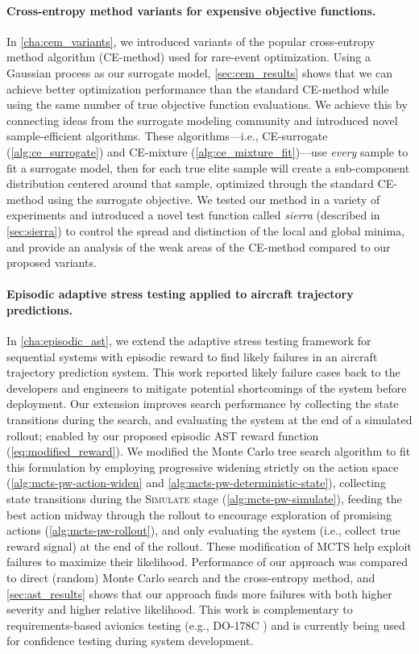 \paragraph{Cross-entropy method variants for expensive objective functions.}
In \cref{cha:cem_variants}, we introduced variants of the popular cross-entropy method algorithm (CE-method) used for rare-event optimization.
Using a Gaussian process as our surrogate model, \cref{sec:cem_results} shows that we can achieve better optimization performance than the standard CE-method while using the same number of true objective function evaluations.
We achieve this by connecting ideas from the surrogate modeling community and introduced novel sample-efficient algorithms.
These algorithms---i.e., CE-surrogate (\cref{alg:ce_surrogate}) and CE-mixture (\cref{alg:ce_mixture_fit})---use \textit{every} sample to fit a surrogate model, then for each true elite sample will create a sub-component distribution centered around that sample, optimized through the standard CE-method using the surrogate objective.
We tested our method in a variety of experiments and introduced a novel test function called \textit{sierra} (described in \cref{sec:sierra}) to control the spread and distinction of the local and global minima, and provide an analysis of the weak areas of the CE-method compared to our proposed variants.


\paragraph{Episodic adaptive stress testing applied to aircraft trajectory predictions.} In \cref{cha:episodic_ast}, we extend the adaptive stress testing framework for sequential systems with episodic reward to find likely failures in an aircraft trajectory prediction system.
This work reported likely failure cases back to the developers and engineers to mitigate potential shortcomings of the system before deployment.
Our extension improves search performance by collecting the state transitions during the search, and evaluating the system at the end of a simulated rollout; enabled by our proposed episodic AST reward function (\cref{eq:modified_reward}).
We modified the Monte Carlo tree search algorithm to fit this formulation by employing progressive widening strictly on the action space (\cref{alg:mcts-pw-action-widen} and \cref{alg:mcts-pw-deterministic-state}), collecting state transitions during the \textsc{Simulate} stage (\cref{alg:mcts-pw-simulate}), feeding the best action midway through the rollout to encourage exploration of promising actions (\cref{alg:mcts-pw-rollout}), and only evaluating the system (i.e., collect true reward signal) at the end of the rollout.
These modification of MCTS help exploit failures to maximize their likelihood.
Performance of our approach was compared to direct (random) Monte Carlo search and the cross-entropy method, and \cref{sec:ast_results} shows that our approach finds more failures with both higher severity and higher relative likelihood.
This work is complementary to requirements-based avionics testing (e.g., DO-178C \cite{do178c}) and is currently being used for confidence testing during system development.



